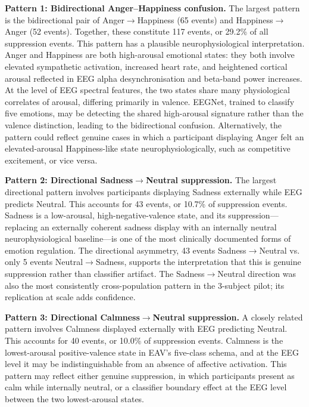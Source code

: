 \textbf{Pattern 1: Bidirectional Anger--Happiness confusion.} The largest pattern is the bidirectional pair of Anger$\rightarrow$Happiness (65 events) and Happiness$\rightarrow$Anger (52 events). Together, these constitute 117 events, or 29.2\% of all suppression events. This pattern has a plausible neurophysiological interpretation. Anger and Happiness are both high-arousal emotional states: they both involve elevated sympathetic activation, increased heart rate, and heightened cortical arousal reflected in EEG alpha desynchronisation and beta-band power increases. At the level of EEG spectral features, the two states share many physiological correlates of arousal, differing primarily in valence. EEGNet, trained to classify five emotions, may be detecting the shared high-arousal signature rather than the valence distinction, leading to the bidirectional confusion. Alternatively, the pattern could reflect genuine cases in which a participant displaying Anger felt an elevated-arousal Happiness-like state neurophysiologically, such as competitive excitement, or vice versa.

\textbf{Pattern 2: Directional Sadness$\rightarrow$Neutral suppression.} The largest directional pattern involves participants displaying Sadness externally while EEG predicts Neutral. This accounts for 43 events, or 10.7\% of suppression events. Sadness is a low-arousal, high-negative-valence state, and its suppression---replacing an externally coherent sadness display with an internally neutral neurophysiological baseline---is one of the most clinically documented forms of emotion regulation. The directional asymmetry, 43 events Sadness$\rightarrow$Neutral vs. only 5 events Neutral$\rightarrow$Sadness, supports the interpretation that this is genuine suppression rather than classifier artifact. The Sadness$\rightarrow$Neutral direction was also the most consistently cross-population pattern in the 3-subject pilot; its replication at scale adds confidence.

\textbf{Pattern 3: Directional Calmness$\rightarrow$Neutral suppression.} A closely related pattern involves Calmness displayed externally with EEG predicting Neutral. This accounts for 40 events, or 10.0\% of suppression events. Calmness is the lowest-arousal positive-valence state in EAV's five-class schema, and at the EEG level it may be indistinguishable from an absence of affective activation. This pattern may reflect either genuine suppression, in which participants present as calm while internally neutral, or a classifier boundary effect at the EEG level between the two lowest-arousal states.

